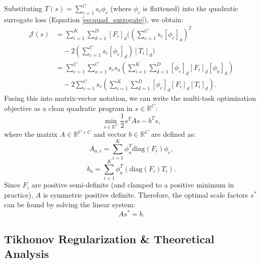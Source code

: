\documentclass{article}
\theoremstyle{plain}
\theoremstyle{definition}
\theoremstyle{remark}
\begin{document}
Substituting $T(s) = \sum_{c=1}^C s_c \phi_c$ (where $\phi_c$ is flattened) into the quadratic surrogate loss (Equation \ref{eq:quad_surrogate}), we obtain:
\begin{align}
    \mathcal{J}(s) &= \sum_{i=1}^K \sum_{d=1}^D [F_i]_d \Biggl( \left( \sum_{c=1}^C s_c [\phi_c]_d \right)^2 \nonumber\\
    &\quad - 2 \left( \sum_{c=1}^C s_c [\phi_c]_d \right) [T_i]_d \Biggr) \nonumber\\
    &= \sum_{c=1}^C \sum_{a=1}^C s_c s_a \left( \sum_{i=1}^K \sum_{d=1}^D [\phi_c]_d [F_i]_d [\phi_a]_d \right) \nonumber\\
    &\quad - 2 \sum_{c=1}^C s_c \left( \sum_{i=1}^K \sum_{d=1}^D [\phi_c]_d [F_i]_d [T_i]_d \right).
\end{align}
Fusing this into matrix-vector notation, we can write the multi-task optimization objective as a clean quadratic program in $s \in \mathbb{R}^C$:
\begin{equation}
    \min_{s \in \mathbb{R}^C} \frac{1}{2} s^T A s - b^T s,
    \label{eq:qp}
\end{equation}
where the matrix $A \in \mathbb{R}^{C \times C}$ and vector $b \in \mathbb{R}^C$ are defined as:
\begin{equation}
    A_{a, c} = \sum_{i=1}^K \phi_a^T \text{diag}(F_i) \phi_c,
    \label{eq:matrix_A}
\end{equation}
\begin{equation}
    b_a = \sum_{i=1}^K \phi_a^T \left( \text{diag}(F_i) T_i \right).
    \label{eq:vector_b}
\end{equation}
Since $F_i$ are positive semi-definite (and clamped to a positive minimum in practice), $A$ is symmetric positive definite. 
Therefore, the optimal scale factors $s^*$ can be found by solving the linear system:
\begin{equation}
    A s^* = b.
\end{equation}

\subsection{Tikhonov Regularization \& Theoretical Analysis}
\label{subsec:tikhonov}
\end{document}
